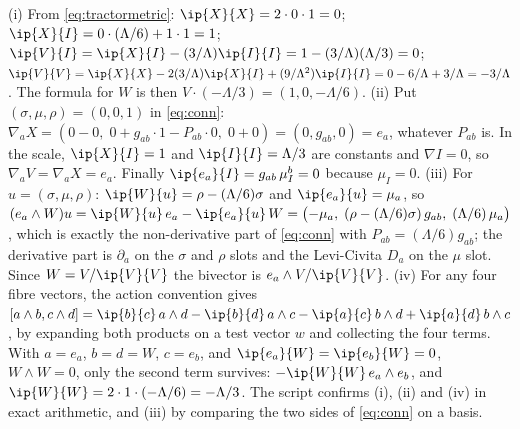 (i) From \eqref{eq:tractormetric}: $\ip{X}{X} = 2\cdot 0\cdot 1 = 0$; $\ip{X}{I} = 0\cdot(\Lambda/6) + 1\cdot 1 = 1$; $\ip{V}{I} = \ip{X}{I} - (3/\Lambda)\ip{I}{I} = 1 - (3/\Lambda)(\Lambda/3) = 0$; $\ip{V}{V} = \ip{X}{X} - 2(3/\Lambda)\ip{X}{I} + (9/\Lambda^2)\ip{I}{I} = 0 - 6/\Lambda + 3/\Lambda = -3/\Lambda$. The formula for $W$ is then $V\cdot(-\Lambda/3) = (1, 0, -\Lambda/6)$.
(ii) Put $(\sigma,\mu,\rho) = (0,0,1)$ in \eqref{eq:conn}: $\nabla_a X = (0 - 0,\; 0 + g_{ab}\cdot 1 - P_{ab}\cdot 0,\; 0 + 0) = (0, g_{ab}, 0) = e_a$, whatever $P_{ab}$ is. In the scale, $\ip{X}{I} = 1$ and $\ip{I}{I} = \Lambda/3$ are constants and $\nabla I = 0$, so $\nabla_a V = \nabla_a X = e_a$. Finally $\ip{e_a}{I} = g_{ab}\,\mu_I^b = 0$ because $\mu_I = 0$.
(iii) For $u = (\sigma,\mu,\rho)$: $\ip{W}{u} = \rho - (\Lambda/6)\sigma$ and $\ip{e_a}{u} = \mu_a$, so
$(e_a\wedge W)u = \ip{W}{u}\,e_a - \ip{e_a}{u}\,W = \bigl(-\mu_a,\; (\rho - (\Lambda/6)\sigma)\,g_{ab},\; (\Lambda/6)\,\mu_a\bigr)$,
which is exactly the non-derivative part of \eqref{eq:conn} with $P_{ab} = (\Lambda/6)g_{ab}$; the derivative part is $\partial_a$ on the $\sigma$ and $\rho$ slots and the Levi-Civita $D_a$ on the $\mu$ slot. Since $W = V/\ip{V}{V}$ the bivector is $e_a\wedge V/\ip{V}{V}$.
(iv) For any four fibre vectors, the action convention gives $[a\wedge b, c\wedge d] = \ip{b}{c}\,a\wedge d - \ip{b}{d}\,a\wedge c - \ip{a}{c}\,b\wedge d + \ip{a}{d}\,b\wedge c$, by expanding both products on a test vector $w$ and collecting the four terms. With $a = e_a$, $b = d = W$, $c = e_b$, and $\ip{e_a}{W} = \ip{e_b}{W} = 0$, $W\wedge W = 0$, only the second term survives: $-\ip{W}{W}\,e_a\wedge e_b$, and $\ip{W}{W} = 2\cdot 1\cdot(-\Lambda/6) = -\Lambda/3$. The script confirms (i), (ii) and (iv) in exact arithmetic, and (iii) by comparing the two sides of \eqref{eq:conn} on a basis.
